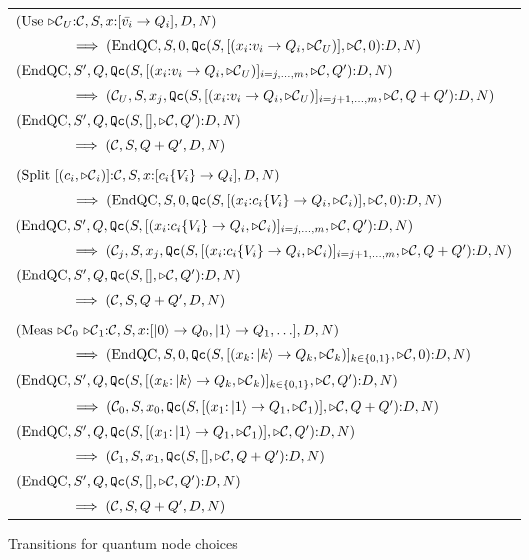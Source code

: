 \begin{figure}[htbp]
\begin{tabular}{l}
$(\mathrm{Use}\ \lbl_U{:}\cd,S,x{:}[\bar{v_i}\to Q_i],D,N) $ \\
$\qquad\qquad\implies (\mathrm{EndQC},S,0, 
	\text{\texttt{Qc}}{}(S,[(x_i{:}v_i\to Q_i,{\triangleright\mathcal{C}}_U)],\triangleright\mathcal{C}, 0){:}D,N)$ \\[12pt]
$(\mathrm{EndQC},S',Q,\text{\texttt{Qc}}{}(S,
	[(x_i{:}v_i\to Q_i,{\triangleright\mathcal{C}}_U)]_{i=j,\ldots,m},\triangleright\mathcal{C}, Q'){:}D,N) 
       $ \\
$\qquad\qquad\implies ({\mathcal{C}}_U,S,x_j, \text{\texttt{Qc}}{}
	(S,[(x_i{:}v_i\to Q_i,{\triangleright\mathcal{C}}_U)]_{i=j+1,\ldots,m},\triangleright\mathcal{C},Q+Q'){:}D,N)$ \\[12pt]
$(\mathrm{EndQC},S',Q,\text{\texttt{Qc}}{}(S,[],\triangleright\mathcal{C}, Q'){:}D,N) 
       $ \\
$\qquad\qquad\implies (\mathcal{C},S,Q+Q', D,N)$\\[12pt]
\\
$(\mathrm{Split}\ [(c_i,\lbl_i)]{:}\cd,S,x{:}[c_i\{V_i\}\to Q_i],D,N) $ \\
$\qquad\qquad\implies (\mathrm{EndQC},S,0, 
	\text{\texttt{Qc}}{}(S,[(x_i{:}c_i\{V_i\}\to Q_i, {\triangleright\mathcal{C}}_i)],\triangleright\mathcal{C}, 0){:}D,N)$ \\[12pt]
$(\mathrm{EndQC},S',Q,\text{\texttt{Qc}}{}(S,[(x_i{:}c_i\{V_i\}\to Q_i, {\triangleright\mathcal{C}}_i)]_{i=j,\ldots,m},\triangleright\mathcal{C}, Q'){:}D,N) 
       $ \\
$\qquad\qquad\implies ({\mathcal{C}}_j,S,x_j, \text{\texttt{Qc}}{}(S,[(x_i{:}c_i\{V_i\}\to Q_i, {\triangleright\mathcal{C}}_i)]_{i=j+1,\ldots,m},\triangleright\mathcal{C},Q+Q'){:}D,N)$ \\[12pt]
$(\mathrm{EndQC},S',Q,\text{\texttt{Qc}}{}(S,[],\triangleright\mathcal{C}, Q'){:}D,N) 
       $ \\
$\qquad\qquad\implies (\mathcal{C},S,Q+Q', D,N)$\\
\\
$(\mathrm{Meas}\ \lbl_0\ \lbl_1{:}\cd,S,x{:}[\ket{0}\to Q_0,\ket{1}\to Q_1, 
    \ldots],D,N) $ \\
$\qquad\qquad\implies (\mathrm{EndQC},S,0, 
       \text{\texttt{Qc}}{}(S,[(x_k{:}\left\vert{k}\right\rangle\to 
	Q_k,{\triangleright\mathcal{C}}_k)]_{k\in\{0,1\}},\triangleright\mathcal{C}, 0){:}D,N)$ \\[12pt]
$(\mathrm{EndQC},S',Q, \text{\texttt{Qc}}{}(S,
	[(x_k{:}\left\vert{k}\right\rangle\to Q_k,{\triangleright\mathcal{C}}_k)]_{k\in\{0,1\}},\triangleright\mathcal{C}, Q'){:}D,N) 
       $ \\
$\qquad\qquad\implies ({\mathcal{C}}_0,S,x_0,  
	\text{\texttt{Qc}}{}(S,[(x_1{:}\left\vert{1}\right\rangle\to 
	Q_1,{\triangleright\mathcal{C}}_1)],\triangleright\mathcal{C},Q+Q'){:}D,N)$ \\[12pt]
$(\mathrm{EndQC},S',Q, \text{\texttt{Qc}}{}(S,
	[(x_1{:}\left\vert{1}\right\rangle\to Q_1,{\triangleright\mathcal{C}}_1)],\triangleright\mathcal{C}, Q'){:}D,N) 
       $ \\
$\qquad\qquad\implies ({\mathcal{C}}_1,S,x_1,  
	\text{\texttt{Qc}}{}(S,[],\triangleright\mathcal{C},Q+Q'){:}D,N)$ \\[12pt]
$(\mathrm{EndQC},S',Q,\text{\texttt{Qc}}{}(S,[],\triangleright\mathcal{C}, Q'){:}D,N) 
       $ \\
$\qquad\qquad\implies (\mathcal{C},S,Q+Q', D,N)$
\end{tabular}
\caption{Transitions for quantum node choices}\label{fig:trans:measures}
\end{figure}

